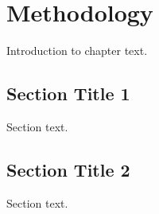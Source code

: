 \chapter{Methodology}
\label{chap:method}
Introduction to chapter text.

\section{Section Title 1}
Section text.

\section{Section Title 2}
Section text.